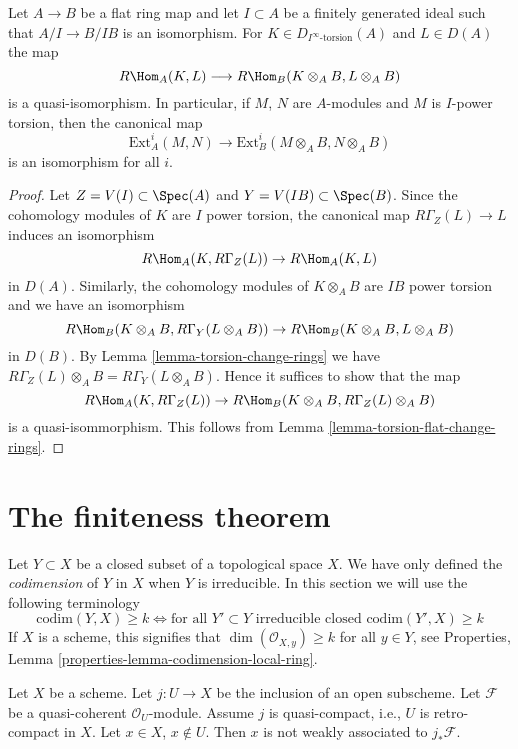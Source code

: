\begin{lemma}
\label{lemma-neighbourhood-extensions}
Let $A \to B$ be a flat ring map and let $I \subset A$ be a
finitely generated ideal such that $A/I \to B/IB$ is an isomorphism.
For $K \in D_{I^\infty\text{-torsion}}(A)$ and $L \in D(A)$
the map
$$
R\Hom_A(K, L) \longrightarrow R\Hom_B(K \otimes_A B, L \otimes_A B)
$$
is a quasi-isomorphism. In particular, if $M$, $N$ are $A$-modules and
$M$ is $I$-power torsion, then the canonical map
$$
\text{Ext}^i_A(M, N)
\longrightarrow
\text{Ext}^i_B(M \otimes_A B, N \otimes_A B)
$$
is an isomorphism for all $i$. 
\end{lemma}

\begin{proof}
Let $Z = V(I) \subset \Spec(A)$ and $Y = V(IB) \subset \Spec(B)$.
Since the cohomology modules of $K$ are $I$ power torsion, the
canonical map $R\Gamma_Z(L) \to L$ induces an isomorphism
$$
R\Hom_A(K, R\Gamma_Z(L)) \to R\Hom_A(K, L)
$$
in $D(A)$. Similarly, the cohomology modules of $K \otimes_A B$ are
$IB$ power torsion and we have an isomorphism
$$
R\Hom_B(K \otimes_A B, R\Gamma_Y(L \otimes_A B)) \to 
R\Hom_B(K \otimes_A B, L \otimes_A B)
$$
in $D(B)$.
By Lemma \ref{lemma-torsion-change-rings} we have
$R\Gamma_Z(L) \otimes_A B = R\Gamma_Y(L \otimes_A B)$.
Hence it suffices to show that the map
$$
R\Hom_A(K, R\Gamma_Z(L)) \to R\Hom_B(K \otimes_A B, R\Gamma_Z(L) \otimes_A B)
$$
is a quasi-isommorphism. This follows from
Lemma \ref{lemma-torsion-flat-change-rings}.
\end{proof}





\section{The finiteness theorem}
\label{section-finiteness}

\noindent
Let $Y \subset X$ be a closed subset of a topological space $X$.
We have only defined the {\it codimension} of $Y$ in $X$ when
$Y$ is irreducible. In this section we will use the following
terminology
$$
\text{codim}(Y, X) \geq k
\Leftrightarrow
\text{for all } Y' \subset Y\text{ irreducible closed }
\text{codim}(Y', X) \geq k
$$
If $X$ is a scheme, this signifies that $\dim(\mathcal{O}_{X, y}) \geq k$
for all $y \in Y$, see
Properties, Lemma \ref{properties-lemma-codimension-local-ring}.

\begin{lemma}
\label{lemma-weakass-pushforward}
Let $X$ be a scheme. Let $j : U \to X$ be the inclusion of an
open subscheme. Let $\mathcal{F}$ be a quasi-coherent
$\mathcal{O}_U$-module. Assume $j$ is quasi-compact, i.e., $U$
is retro-compact in $X$. Let $x \in X$, $x \not \in U$. Then
$x$ is not weakly associated to $j_*\mathcal{F}$.
\end{lemma}


